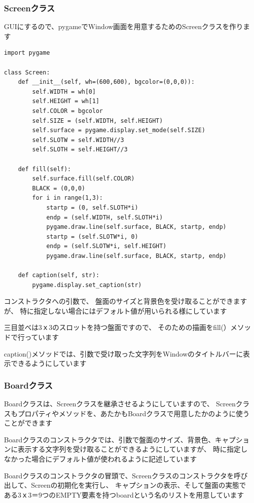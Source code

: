 \documentclass[uplatex,a4paper,11pt,oneside,openany]{jsbook}
\begin{document}
\subsubsection{Screenクラス}

GUIにするので、pygameでWindow画面を用意するためのScreenクラスを作ります

\begin{lstlisting}[caption=class Screen,label=prog05-1]
import pygame

class Screen:
    def __init__(self, wh=(600,600), bgcolor=(0,0,0)):
        self.WIDTH = wh[0]
        self.HEIGHT = wh[1]
        self.COLOR = bgcolor
        self.SIZE = (self.WIDTH, self.HEIGHT)
        self.surface = pygame.display.set_mode(self.SIZE)
        self.SLOTW = self.WIDTH//3
        self.SLOTH = self.HEIGHT//3

    def fill(self):
        self.surface.fill(self.COLOR)
        BLACK = (0,0,0)
        for i in range(1,3):
            startp = (0, self.SLOTH*i)
            endp = (self.WIDTH, self.SLOTH*i)
            pygame.draw.line(self.surface, BLACK, startp, endp)
            startp = (self.SLOTW*i, 0)
            endp = (self.SLOTW*i, self.HEIGHT)
            pygame.draw.line(self.surface, BLACK, startp, endp)

    def caption(self, str):
        pygame.display.set_caption(str)
\end{lstlisting}%

コンストラクタへの引数で、
盤面のサイズと背景色を受け取ることができますが、
特に指定しない場合にはデフォルト値が用いられる様にしています

三目並べは3ｘ3のスロットを持つ盤面ですので、
そのための描画をfill(）メソッドで行っています

caption()メソッドでは、引数で受け取った文字列をWindowのタイトルバーに表示できるようにしています

\subsubsection{Boardクラス}

Boardクラスは、Screenクラスを継承させるようにしていますので、
Screenクラスもプロパティやメソッドを、あたかもBoardクラスで用意したかのように使うことができます

Boardクラスのコンストラクタでは、引数で盤面のサイズ、背景色、キャプションに表示する文字列を受け取ることができるようにしていますが、
時に指定しなかった場合にデフォルト値が使われるように記述しています

Boardクラスのコンストラクタの冒頭で、Screenクラスのコンストラクタを呼び出して、Screenの初期化を実行し、
キャプションの表示、そして盤面の実態である3ｘ3＝9つのEMPTY要素を持つboardという名のリストを用意しています
\end{document}
